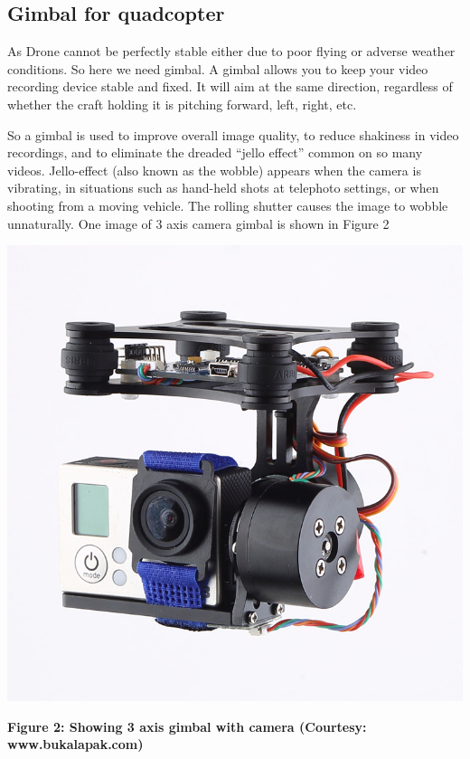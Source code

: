 \documentclass[11pt,a4paper]{article}
\begin{document}
		\subsection{Gimbal for quadcopter}
		As Drone cannot be perfectly stable either due to poor flying or adverse weather conditions. So here we need gimbal. A gimbal allows you to keep your video recording device stable and fixed. It will aim at the same direction, regardless of whether the craft holding it is pitching forward, left, right, etc.
		
		So a gimbal is used to improve overall image quality, to reduce shakiness in video recordings, and to eliminate the dreaded “jello effect” common on so many videos. Jello-effect (also known as the wobble) appears when the camera is vibrating, in situations such as hand-held shots at telephoto settings, or when shooting from a moving vehicle. The rolling shutter causes the image to wobble unnaturally. One image of 3 axis camera gimbal is shown in Figure 2
		\newline
		\newline
		\begin{center}
			\includegraphics[scale=0.4]{../Images/3_Axis_Gimbal_Example.jpg}
		\end{center}
		\begin{center}
			\textbf{Figure 2: Showing 3 axis gimbal with camera (Courtesy: www.bukalapak.com)}
		\end{center}
		
\end{document}
